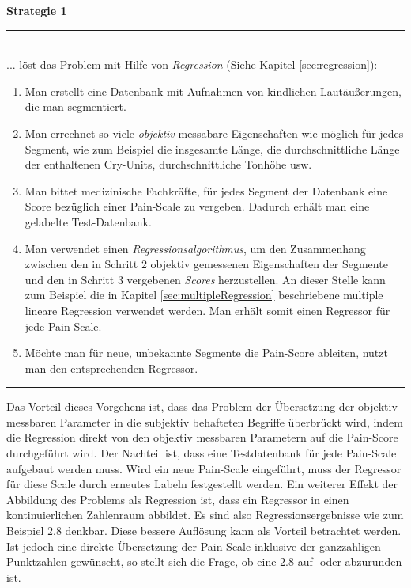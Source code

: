 \textbf{Strategie 1} \noindent\rule{0.83\linewidth}{0.3pt}\\
... löst das Problem mit Hilfe von \emph{Regression} (Siehe Kapitel \ref{sec:regression}):
\begin{enumerate}
 \item Man erstellt eine Datenbank mit Aufnahmen von kindlichen Lautäußerungen, die man  segmentiert.
 \item Man errechnet \glqq so viele \emph{objektiv} messabare Eigenschaften wie möglich\grqq{} für jedes Segment, wie zum Beispiel die insgesamte Länge, die durchschnittliche Länge der enthaltenen Cry-Units, durchschnittliche Tonhöhe usw.
 \item Man bittet medizinische Fachkräfte, für jedes Segment der Datenbank eine Score bezüglich einer Pain-Scale zu vergeben. Dadurch erhält man eine gelabelte Test-Datenbank.
 \item  Man verwendet einen \emph{Regressionsalgorithmus}, um den Zusammenhang zwischen den in Schritt 2 objektiv gemessenen Eigenschaften der Segmente und den in Schritt 3 vergebenen \emph{Scores} herzustellen. An dieser Stelle kann zum Beispiel die in Kapitel \ref{sec:multipleRegression} beschriebene multiple lineare Regression verwendet werden. Man erhält somit einen Regressor für jede Pain-Scale.
 \item Möchte man für neue, unbekannte Segmente die Pain-Score ableiten, nutzt man den entsprechenden Regressor.
\end{enumerate}
\noindent\rule{\linewidth}{0.3pt}

Das Vorteil dieses Vorgehens ist, dass das Problem der Übersetzung der objektiv messbaren Parameter in die subjektiv behafteten Begriffe überbrückt wird, indem die Regression direkt von den objektiv messbaren Parametern auf  die Pain-Score durchgeführt wird. Der Nachteil ist, dass eine Testdatenbank für jede Pain-Scale aufgebaut werden muss. Wird ein neue Pain-Scale eingeführt, muss der Regressor für diese Scale durch erneutes Labeln festgestellt werden. Ein weiterer Effekt der Abbildung des Problems als Regression ist, dass ein Regressor in einen kontinuierlichen Zahlenraum abbildet. Es sind also Regressionsergebnisse wie zum Beispiel $2.8$ denkbar. Diese \glqq bessere Auflösung\grqq{} kann als Vorteil betrachtet werden. Ist jedoch eine direkte Übersetzung der Pain-Scale inklusive der ganzzahligen Punktzahlen gewünscht, so stellt sich die Frage, ob eine $2.8$ auf- oder abzurunden ist.

\vspace{5mm}

